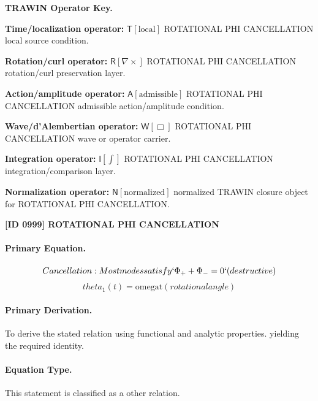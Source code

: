 \par\vspace{0.45\baselineskip}
\noindent\begin{minipage}[t]{\linewidth}
\begingroup
\small
\raggedright
\textbf{TRAWIN Operator Key.}\par
\noindent\textbf{Time/localization operator:} $\mathsf{T}\!\left[\mathrm{local}\right]$ ROTATIONAL PHI CANCELLATION local source condition.\par
\noindent\textbf{Rotation/curl operator:} $\mathsf{R}\!\left[\nabla\times\right]$ ROTATIONAL PHI CANCELLATION rotation/curl preservation layer.\par
\noindent\textbf{Action/amplitude operator:} $\mathsf{A}\!\left[\mathrm{admissible}\right]$ ROTATIONAL PHI CANCELLATION admissible action/amplitude condition.\par
\noindent\textbf{Wave/d'Alembertian operator:} $\mathsf{W}\!\left[\Box\right]$ ROTATIONAL PHI CANCELLATION wave or operator carrier.\par
\noindent\textbf{Integration operator:} $\mathsf{I}\!\left[\int\right]$ ROTATIONAL PHI CANCELLATION integration/comparison layer.\par
\noindent\textbf{Normalization operator:} $\mathsf{N}\!\left[\mathrm{normalized}\right]$ normalized TRAWIN closure object for ROTATIONAL PHI CANCELLATION.\par
\endgroup
\end{minipage}

\clearpage
\noindent\textbf{[ID 0999] ROTATIONAL PHI CANCELLATION}\par
\vspace{0.35em}
\paragraph{Primary Equation.}
\[
Cancellation: Most modes satisfy `\Phi_+ + \Phi_- = 0` (destructive)
\]
\[
theta_1(t) = \mathrm{omegat} (rotational angle)
\]

\paragraph{Primary Derivation.}
To derive the stated relation using functional and analytic properties. yielding the required identity.
\paragraph{Equation Type.}
This statement is classified as a other relation.

